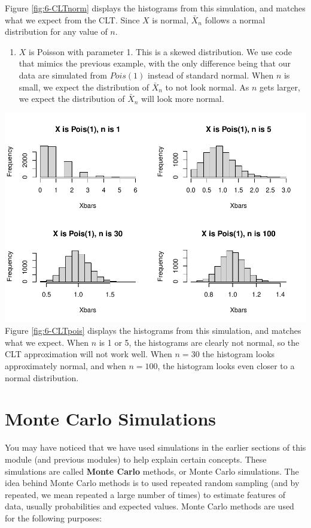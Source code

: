 \documentclass[
]{book}
\providecommand{\tightlist}{%
  \setlength{\itemsep}{0pt}\setlength{\parskip}{0pt}}
\begin{document}
Figure \ref{fig:6-CLTnorm} displays the histograms from this simulation, and matches what we expect from the CLT. Since \(X\) is normal, \(\bar{X}_n\) follows a normal distribution for any value of \(n\).

\begin{enumerate}
\def\labelenumi{\arabic{enumi}.}
\setcounter{enumi}{1}
\tightlist
\item
  \(X\) is Poisson with parameter 1. This is a skewed distribution. We use code that mimics the previous example, with the only difference being that our data are simulated from \(Pois(1)\) instead of standard normal. When \(n\) is small, we expect the distribution of \(\bar{X}_n\) to not look normal. As \(n\) gets larger, we expect the distribution of \(\bar{X}_n\) will look more normal.
\end{enumerate}

\includegraphics{bookdown-demo_files/figure-latex/6-CLTpois-1.pdf}
Figure \ref{fig:6-CLTpois} displays the histograms from this simulation, and matches what we expect. When \(n\) is 1 or 5, the histograms are clearly not normal, so the CLT approximation will not work well. When \(n=30\) the histogram looks approximately normal, and when \(n=100\), the histogram looks even closer to a normal distribution.

\hypertarget{MCsims}{%
\section{Monte Carlo Simulations}\label{MCsims}}

You may have noticed that we have used simulations in the earlier sections of this module (and previous modules) to help explain certain concepts. These simulations are called \textbf{Monte Carlo} methods, or Monte Carlo simulations. The idea behind Monte Carlo methods is to used repeated random sampling (and by repeated, we mean repeated a large number of times) to estimate features of data, usually probabilities and expected values. Monte Carlo methods are used for the following purposes:
\end{document}
